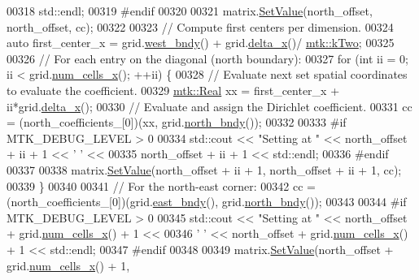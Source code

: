 \begin{DoxyCode}
00318     std::endl;
00319 \textcolor{preprocessor}{  #endif}
00320 
00321   matrix.\hyperlink{classmtk_1_1DenseMatrix_a784ce5784109ac86bfb9d8562b334b13}{SetValue}(north\_offset, north\_offset, cc);
00322 
00323   \textcolor{comment}{// Compute first centers per dimension.}
00324   \textcolor{keyword}{auto} first\_center\_x = grid.\hyperlink{classmtk_1_1UniStgGrid2D_af2b1712387ded85edaf2b64617d3fc13}{west\_bndy}() + grid.\hyperlink{classmtk_1_1UniStgGrid2D_aca4710004c4a7da6a9e8fd6ab32a691f}{delta\_x}()/
      \hyperlink{group__c01-roots_gaf39c2d851a2db744f4feb1c5ab3ec2cf}{mtk::kTwo};
00325 
00326   \textcolor{comment}{// For each entry on the diagonal (north boundary):}
00327   \textcolor{keywordflow}{for} (\textcolor{keywordtype}{int} ii = 0; ii < grid.\hyperlink{classmtk_1_1UniStgGrid2D_a2d182866a398aba8e4829590e85bf939}{num\_cells\_x}(); ++ii) \{
00328     \textcolor{comment}{// Evaluate next set spatial coordinates to evaluate the coefficient.}
00329     \hyperlink{group__c01-roots_gac080bbbf5cbb5502c9f00405f894857d}{mtk::Real} xx = first\_center\_x + ii*grid.\hyperlink{classmtk_1_1UniStgGrid2D_aca4710004c4a7da6a9e8fd6ab32a691f}{delta\_x}();
00330     \textcolor{comment}{// Evaluate and assign the Dirichlet coefficient.}
00331     cc = (north\_coefficients\_[0])(xx, grid.\hyperlink{classmtk_1_1UniStgGrid2D_afe1ead253cdeb5503e0489eba8fd84e2}{north\_bndy}());
00332 
00333 \textcolor{preprocessor}{    #if MTK\_DEBUG\_LEVEL > 0}
00334     std::cout << \textcolor{stringliteral}{"Setting at "} << north\_offset + ii + 1 << \textcolor{charliteral}{' '} <<
00335       north\_offset + ii + 1 << std::endl;
00336 \textcolor{preprocessor}{    #endif}
00337 
00338     matrix.\hyperlink{classmtk_1_1DenseMatrix_a784ce5784109ac86bfb9d8562b334b13}{SetValue}(north\_offset + ii + 1, north\_offset + ii + 1, cc);
00339   \}
00340 
00341   \textcolor{comment}{// For the north-east corner:}
00342   cc = (north\_coefficients\_[0])(grid.\hyperlink{classmtk_1_1UniStgGrid2D_a03f689eb29a6369b82ce1207c655d5ff}{east\_bndy}(), grid.\hyperlink{classmtk_1_1UniStgGrid2D_afe1ead253cdeb5503e0489eba8fd84e2}{north\_bndy}());
00343 
00344 \textcolor{preprocessor}{  #if MTK\_DEBUG\_LEVEL > 0}
00345   std::cout << \textcolor{stringliteral}{"Setting at "} << north\_offset + grid.\hyperlink{classmtk_1_1UniStgGrid2D_a2d182866a398aba8e4829590e85bf939}{num\_cells\_x}() + 1 <<
00346     \textcolor{charliteral}{' '} << north\_offset + grid.\hyperlink{classmtk_1_1UniStgGrid2D_a2d182866a398aba8e4829590e85bf939}{num\_cells\_x}() + 1 << std::endl;
00347 \textcolor{preprocessor}{  #endif}
00348 
00349   matrix.\hyperlink{classmtk_1_1DenseMatrix_a784ce5784109ac86bfb9d8562b334b13}{SetValue}(north\_offset + grid.\hyperlink{classmtk_1_1UniStgGrid2D_a2d182866a398aba8e4829590e85bf939}{num\_cells\_x}() + 1,

\end{DoxyCode}
